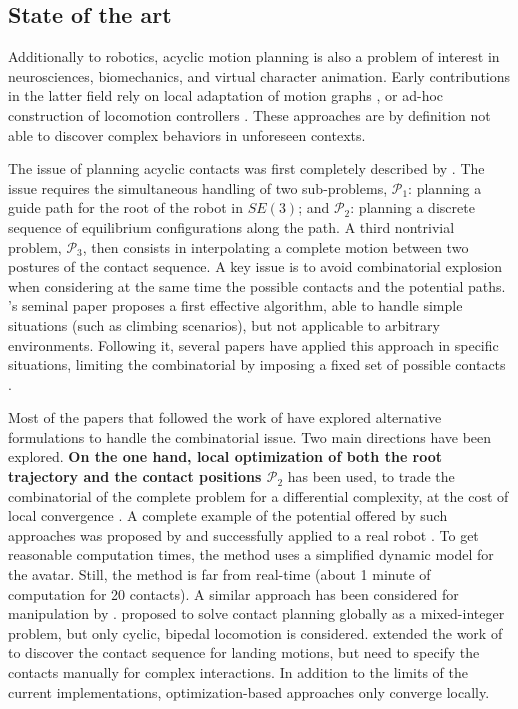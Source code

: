 \subsection{State of the art}



Additionally to robotics, acyclic motion planning is also a problem of interest in neurosciences, biomechanics, and virtual character animation.
Early contributions in the latter field rely on local adaptation of motion graphs \citep{citeulike:220163}, or ad-hoc construction of locomotion controllers \citep{Pettre:2003:LPD:846276.846313}. These approaches are by definition not able to discover complex behaviors in unforeseen contexts.

The issue of planning acyclic contacts was first completely described by \citeauthor{Bretl:2006:MPM:1124573.1124585}. The issue requires the simultaneous handling of two sub-problems, $\mathcal{P}_1$: planning a guide path for the root of the robot in $SE(3)$; and $\mathcal{P}_2$: planning a discrete sequence of equilibrium configurations along the path. A third nontrivial problem, $\mathcal{P}_3$, 
then consists in interpolating a complete motion between two postures of the contact sequence.  A key issue is to avoid combinatorial explosion when considering at the same time the possible contacts and the potential paths. \citeauthor{Bretl:2006:MPM:1124573.1124585}'s seminal paper proposes a first effective algorithm, able to handle simple situations (such as climbing scenarios), but not applicable to arbitrary environments. Following it, seve\-ral papers have applied this approach in specific situations, limiting the combinatorial by imposing a fixed set of possible contacts \citep{Hauser06usingmotion, stilman2010}.

Most of the papers that followed the work of \citeauthor{Bretl:2006:MPM:1124573.1124585} have explored alternative formulations to handle the combinatorial issue. Two main directions have been explored. \textbf{On the one hand, local optimization of both the root trajectory \Pa and the contact positions $\mathcal{P}_2$} has been used, to trade the combinatorial of the complete problem for a differential complexity, at the cost of local convergence \citep{1631739}. A complete example of the potential offered by such approaches was proposed by \cite{Mordatch:2012:DCB:2185520.2185539} and successfully applied to a real robot \citep{mordatch2015}. To get reasonable computation times, the method uses a simplified dynamic model for the avatar. Still, the method is far from real-time  (about 1 minute of computation for 20 contacts).  A similar approach has been considered for manipulation by \cite{gabicciniisrr15}. \citeauthor{DBLP:conf/humanoids/DeitsT14} proposed to solve contact planning globally as a mixed-integer problem, but only cyclic, bipedal locomotion is considered. 
\citeauthor{dai2014whole} extended the work of \citeauthor{Posa:2014:DMT:2568343.2568352} to discover the contact sequence for landing motions, but need to specify
the contacts manually for complex interactions.
In addition to the limits of the current implementations, optimization-based approaches only converge locally.

